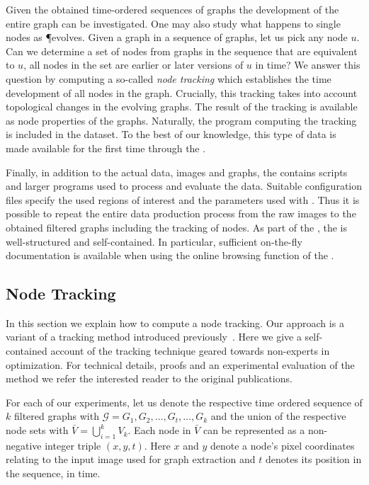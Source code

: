 	Given the obtained time-ordered sequences of graphs the development of the entire graph can be investigated. One may also study what happens to single nodes as \P evolves. Given a graph in a sequence of graphs, let us pick any node $u$. Can we determine a set of nodes from graphs in the sequence that are equivalent to $u$, \ie all nodes in the set are earlier or later versions of $u$ in time? We answer this question by computing a so-called \emph{node tracking} which establishes the time development of all nodes in the graph. Crucially, this tracking takes into account topological changes in the evolving graphs. The result of the tracking is available as node properties of the graphs. Naturally, the program computing the tracking is included in the dataset. To the best of our knowledge, this type of data is made available for the first time through the \data.

	Finally, in addition to the actual data, \ie images and graphs, the \data contains scripts and larger programs used to process and evaluate the data. Suitable configuration files specify the used regions of interest and the parameters used with \NEFI. Thus it is possible to repeat the entire data production process from the raw images to the obtained filtered graphs including the tracking of nodes. As part of the \SMGR, the \data is well-structured and self-contained. In particular, sufficient on-the-fly documentation is available when using the online browsing function of the \SMGR.

	\subsection{Node Tracking}

		In this section we explain how to compute a node tracking. Our approach is a variant of a tracking method introduced previously~\cite{woll2013novel,Karrenbauer2013}. Here we give a self-contained account of the tracking technique geared towards non-experts in optimization. For technical details, proofs and an experimental evaluation of the method we refer the interested reader to the original publications.

		For each of our experiments, let us denote the respective time ordered sequence of $k$ filtered graphs with $\mathcal{G} = {G_1, G_2, \dots, G_t, \dots, G_k}$ and the union of the respective node sets with $\bar{V} = \bigcup_{i=1}^{k} V_{k}$. Each node in $\bar{V}$ can be represented as a non-negative integer triple $(x,y,t)$. Here $x$ and $y$ denote a node's pixel coordinates relating to the input image used for graph extraction and $t$ denotes its position in the sequence, \ie in time.

